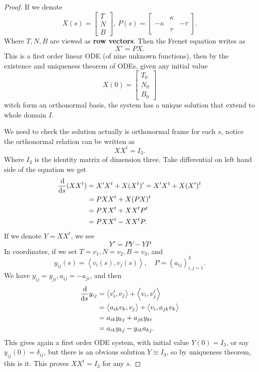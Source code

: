 \begin{proof}
    If we denote \[
        X(s)=\begin{bmatrix}
            T \\ N \\ B
        \end{bmatrix},\ 
        P(s)=\begin{bmatrix}
            & \kappa & \\
            -\kappa & & -\tau \\
            & \tau & 
        \end{bmatrix}
    .\] Where \(T,N,B\) are viewed as \textbf{row vectors}. Then the Frenet equation
    writes as \[
        X'=PX
    .\] This is a first order linear ODE (of nine unknown functions), then by the
    existence and uniqueness theorem of ODEs, given any initial value \[
        X(0)=\begin{bmatrix}
            T_0 \\ N_0 \\ B_0
        \end{bmatrix}
    \] witch form an orthonormal basis, the system has a unique solution that extend
    to whole domain \(I\).

    We need to check the solution actually is orthonormal frame for each \(s\),
    notice the orthonormal relation can be written as \[
        XX^t=I_3
    .\] Where \(I_3\) is the identity matrix of dimension three. Take differential
    on left hand side of the equation we get
    \begin{align*}
        \frac{\dif}{\dif s}(XX^t)&= X'X^t+X(X^t)'=X'X^t+X(X')^t \\
        &= PXX^t+X(PX)^t \\
        &= PXX^t+XX^t P^t \\
        &= PXX^t-XX^t P
    .\end{align*}
    If we denote \(Y=XX^t\), we see \[
        Y'=PY-YP
    \] In coordinates, if we set \(T=v_1,N=v_2,B=v_3\), and \[
        y_{ij}(s)=\left<v_i(s),v_j(s)\right> ,\quad
        P=(a_{ij})_{i,j=1}^3
    .\] We have \(y_{ij}=y_{ji}, a_{ij}=-a_{ji}\), and then
    \begin{align*}
        \frac{\dif}{\dif s}y_{ij}&= \left<v_i',v_j\right> +\left<v_i,v_j'\right> \\
        &= \left<a_{ik}v_k,v_j\right> +\left<v_i,a_{jk}v_k\right> \\
        &= a_{ik}y_{kj}+a_{jk}y_{ki} \\
        &= a_{ik}y_{kj}-y_{ik}a_{kj}
    .\end{align*}
    This gives again a first order ODE system, with initial value \(Y(0)=I_3\), or
    say \(y_{ij}(0)=\delta_{ij}\), but there is an obvious solution \(Y\equiv I_3\),
    so by uniqueness theorem, this is it. This proves \(XX^t=I_3\) for any \(s\).


\end{proof}
